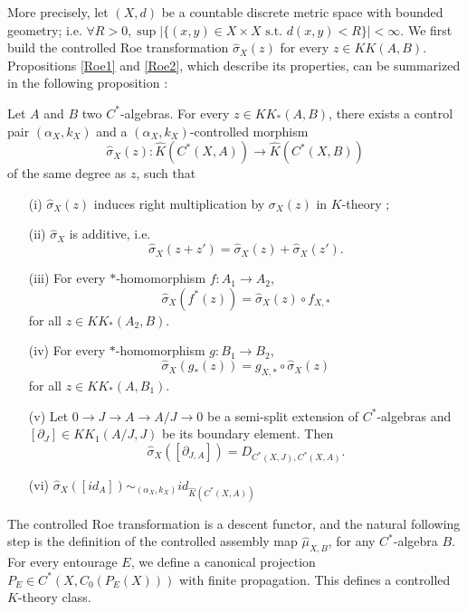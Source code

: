 More precisely, let $(X,d)$ be a countable discrete metric space with bounded geometry; i.e. $\forall R>0,\sup | \{ (x,y) \in X\times X \text{ s.t. }d(x,y)<R\} |<\infty$. We first build the controlled Roe transformation $\hat\sigma_X(z)$ for every $z\in KK(A,B)$. Propositions \ref{Roe1} and \ref{Roe2}, which describe its properties, can be summarized in the following proposition :

\begin{prop}
Let $A$ and $B$ two $C^*$-algebras. For every $z\in KK_*(A,B)$, there exists a control pair $(\alpha_X,k_X)$ and a $(\alpha_X,k_X)$-controlled morphism
\[\hat\sigma_X(z) : \hat K(C^*(X,A))\rightarrow \hat K(C^*(X,B))\]
of the same degree as $z$, such that
\begin{enumerate}
\item[(i)] $\hat\sigma_X(z)$ induces right multiplication by $\sigma_X(z)$ in $K$-theory ;
\item[(ii)] $\hat\sigma_X$ is additive, i.e.
\[\hat\sigma_X(z+z')=\hat\sigma_X(z)+\hat\sigma_X(z').\]
\item[(iii)] For every $*$-homomorphism $f : A_1\rightarrow A_2$,
\[\hat\sigma_X(f^*(z))=\hat\sigma_X(z)\circ f_{X,*}\] for all $z\in KK_*(A_2,B)$.
\item[(iv)] For every $*$-homomorphism $g : B_1\rightarrow B_2$,
\[\hat\sigma_X(g_*(z))= g_{X,*}\circ \hat\sigma_X(z)\] for all $z\in KK_*(A,B_1)$.
\item[(v)] Let $0\rightarrow J\rightarrow A\rightarrow A/J\rightarrow 0$ be a semi-split extension of $C^*$-algebras and $[\partial_J]\in KK_1(A/J,J)$ be its boundary element. Then 
\[\hat\sigma_X([\partial_{J,A}])=D_{C^*(X,J),C^*(X,A)}.\] 
\item[(vi)] $\hat\sigma_X([id_A]) \sim_{(\alpha_X,k_X)} id_{\hat K(C^*(X,A))}$
\end{enumerate}
\end{prop}

The controlled Roe transformation is a descent functor, and the natural following step is the definition of the controlled assembly map $\hat\mu_{X,B}$, for any $C^*$-algebra $B$. For every entourage $E$, we define a canonical projection $P_E\in C^*(X,C_0(P_E(X)))$ with finite propagation. This defines a controlled $K$-theory class.         

